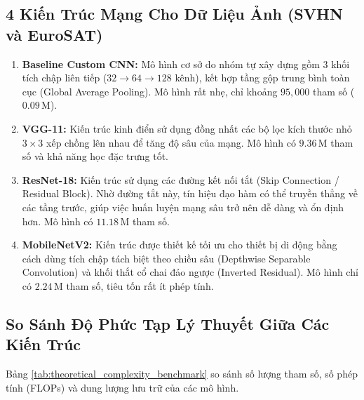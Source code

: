\documentclass[12pt,a4paper]{report}
\begin{document}
\subsection{4 Kiến Trúc Mạng Cho Dữ Liệu Ảnh (SVHN và EuroSAT)}
\begin{enumerate}
    \item \textbf{Baseline Custom CNN:} Mô hình cơ sở do nhóm tự xây dựng gồm 3 khối tích chập liên tiếp ($32 \to 64 \to 128$ kênh), kết hợp tầng gộp trung bình toàn cục (Global Average Pooling). Mô hình rất nhẹ, chỉ khoảng $95,000$ tham số ($0.09\,\text{M}$).
    \item \textbf{VGG-11:} Kiến trúc kinh điển sử dụng đồng nhất các bộ lọc kích thước nhỏ $3 \times 3$ xếp chồng lên nhau để tăng độ sâu của mạng. Mô hình có $9.36\,\text{M}$ tham số và khả năng học đặc trưng tốt.
    \item \textbf{ResNet-18:} Kiến trúc sử dụng các đường kết nối tắt (Skip Connection / Residual Block). Nhờ đường tắt này, tín hiệu đạo hàm có thể truyền thẳng về các tầng trước, giúp việc huấn luyện mạng sâu trở nên dễ dàng và ổn định hơn. Mô hình có $11.18\,\text{M}$ tham số.
    \item \textbf{MobileNetV2:} Kiến trúc được thiết kế tối ưu cho thiết bị di động bằng cách dùng tích chập tách biệt theo chiều sâu (Depthwise Separable Convolution) và khối thắt cổ chai đảo ngược (Inverted Residual). Mô hình chỉ có $2.24\,\text{M}$ tham số, tiêu tốn rất ít phép tính.
\end{enumerate}

\subsection{So Sánh Độ Phức Tạp Lý Thuyết Giữa Các Kiến Trúc}
Bảng \ref{tab:theoretical_complexity_benchmark} so sánh số lượng tham số, số phép tính (FLOPs) và dung lượng lưu trữ của các mô hình.
\end{document}
